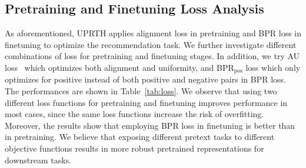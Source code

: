 \subsection{Pretraining and Finetuning Loss Analysis}
As aforementioned, UPRTH applies alignment loss in pretraining and BPR loss in finetuning to optimize the recommendation task. We further investigate different combinations of loss for pretraining and finetuning stages. In addition, we try AU loss~\cite{auloss} which optimizes both alignment and uniformity, and BPR$_{\text{pos}}$ loss which only optimizes for positive instead of both positive and negative pairs in BPR loss. The performances are shown in Table~\ref{tab:loss}. We observe that using two different loss functions for pretraining and finetuning improves performance in most cases, since the same loss functions increase the risk of overfitting. Moreover, the results show that employing BPR loss in finetuning is better than in pretraining. We believe that exposing different pretext tasks to different objective functions results in more robust pretrained representations for downstream tasks.

